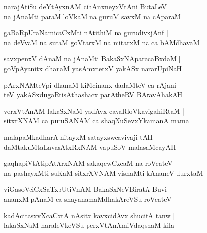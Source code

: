 \documentclass[twoside,12pt,openright]{book}
\newcounter{shloka}[chapter]
\begin{document}
\begin{shloka}%
narajAtiSu deYtAyxnAM cihAnxneyxVtAni ButaLeV |\\
na jAnaMti paraM loVkaM na guruM savxM na cAparaM
\end{shloka}

\begin{shloka}%
gaBaRpUraNamicaCxMti nAtithiM na gurudivxjAnf |\\
na deVvaM na sutaM goVtarxM na mitarxM na ca bAMdhavaM 
\end{shloka}

\begin{shloka}%
savxpenxV dAnaM na jAnaMti BakaSxNAparacaBxdaM |\\
goVpAyanitx dhanaM yasAmxtetxV yakASx nararUpiNaH 
\end{shloka}

\begin{shloka}%
pArxNAMteVpi dhanaM kiMcinanx dadaMteV ca rAjani |\\
teV yakASxdugaRtisAthashacx parAtheRV BAravAhakAH 
\end{shloka}

\begin{shloka}%
verxVtAnAM lakaSxNaM yadAvx cavaRloVkavigahiRtaM |\\
sitxrXNAM ca puruSANAM ca shaqNuSevxYkamanA mama 
\end{shloka}

\begin{shloka}%
malapaMkadharA nitayxM satayxswcavivaji tAH |\\
daMtakuMtaLavasAtxRxNAM vapuSoV malasaMcayAH 
\end{shloka}

\begin{shloka}%
gaqhapiVtAtipAtArxNAM sakaqcwCxcaM na roVcateV |\\
na pashayxMti suKaM sitxrXVNAM vishaMti kAnaneV durxtaM 
\end{shloka}

\begin{shloka}%
viGasoVciCxSaTxpUtiVnAM BakaSxNeVBiratA Buvi |\\
ananxM pAnaM ca shayanamaMdhakAreVSu roVcateV
\end{shloka}

\begin{shloka}%
kadAcitasxvXcaCxtA nAsitx kavxcidAvx shucitA tanw |\\
lakaSxNaM naraloVkeVSu perxVtAnAmiVdaqshaM kila
\end{shloka}
\end{document}

